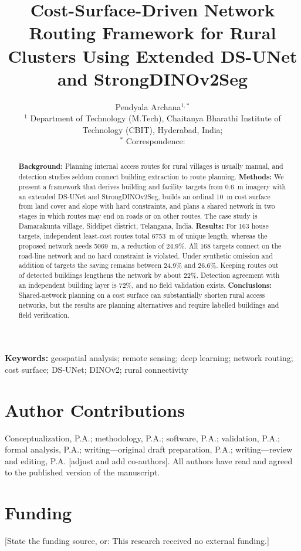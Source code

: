\documentclass[11pt,a4paper]{article}
\title{Cost-Surface-Driven Network Routing Framework for Rural Clusters Using Extended DS-UNet and StrongDINOv2Seg}
\author{Pendyala Archana$^{1,*}$ \needs{add co-authors}\\[2pt]
\small $^{1}$ Department of Technology (M.Tech), Chaitanya Bharathi Institute of Technology (CBIT), Hyderabad, India; \needs{e-mail}\\
\small $^{*}$ Correspondence: \needs{e-mail}}
\date{}
\providecommand{\needs}[1]{{\color{red}[#1]}}
\newcommand{\keywordtext}[1]{\par\smallskip\noindent\textbf{Keywords:} #1\par}
\begin{document}
\maketitle

\begin{abstract}
\textbf{Background:} Planning internal access routes for rural villages is usually manual, and detection studies seldom connect building extraction to route planning. \textbf{Methods:} We present a framework that derives building and facility targets from 0.6~m imagery with an extended DS-UNet and StrongDINOv2Seg, builds an ordinal 10~m cost surface from land cover and slope with hard constraints, and plans a shared network in two stages in which routes may end on roads or on other routes. The case study is Damarakunta village, Siddipet district, Telangana, India. \textbf{Results:} For 163 house targets, independent least-cost routes total 6753~m of unique length, whereas the proposed network needs 5069~m, a reduction of 24.9\%. All 168 targets connect on the road-line network and no hard constraint is violated. Under synthetic omission and addition of targets the saving remains between 24.9\% and 26.6\%. Keeping routes out of detected buildings lengthens the network by about 22\%. Detection agreement with an independent building layer is 72\%, and no field validation exists. \textbf{Conclusions:} Shared-network planning on a cost surface can substantially shorten rural access networks, but the results are planning alternatives and require labelled buildings and field verification.
\end{abstract}
\keywordtext{geospatial analysis; remote sensing; deep learning; network routing; cost surface; DS-UNet; DINOv2; rural connectivity}



\section*{Author Contributions}
Conceptualization, P.A.; methodology, P.A.; software, P.A.; validation, P.A.; formal analysis, P.A.; writing---original draft preparation, P.A.; writing---review and editing, P.A. \needs{adjust and add co-authors}. All authors have read and agreed to the published version of the manuscript.

\section*{Funding}
\needs{State the funding source, or: This research received no external funding.}
\end{document}
